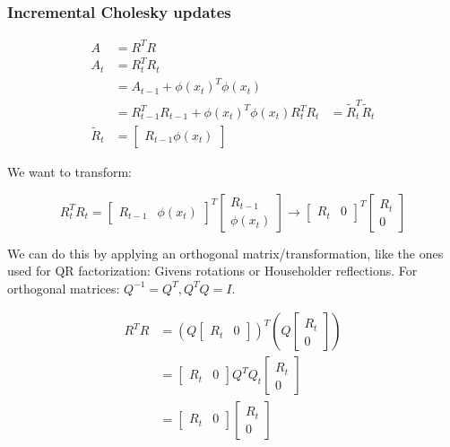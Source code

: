 \documentclass[a4paper]{article}
\begin{document}
\subsubsection*{Incremental Cholesky updates}

\begin{align*}
A &=R^T R \\
A_t &= R_t^T R_t \\
&= A_{t-1} + \phi(x_t)^T \phi(x_t) \\
&= R_{t-1}^T R_{t-1} + \phi(x_t)^T \phi(x_t)
R_t^T R_t &= \tilde{R}_t^T \tilde{R}_t \\
\tilde{R}_t &= \begin{bmatrix}R_{t-1} \phi(x_t) \end{bmatrix}
\end{align*}

We want to transform: 

$$R_t^T R_t = \begin{bmatrix} R_{t-1} & \phi(x_t) \end{bmatrix}^T \begin{bmatrix} R_{t-1} \\ \phi(x_t) \end{bmatrix} \rightarrow \begin{bmatrix} R_{t} & 0 \end{bmatrix}^T \begin{bmatrix} R_{t} \\ 0 \end{bmatrix}$$

We can do this by applying an orthogonal matrix/transformation, like the ones used for QR factorization: Givens rotations or Householder reflections. For orthogonal matrices: $Q^{-1}=Q^T, Q^T Q = I$.

\begin{align*}
R^T R &= (Q \begin{bmatrix} R_{t} & 0 \end{bmatrix})^T (Q \begin{bmatrix} R_{t} \\ 0 \end{bmatrix}) \\
&= \begin{bmatrix} R_{t} & 0 \end{bmatrix} Q^T Q_t \begin{bmatrix} R_{t} \\ 0 \end{bmatrix} \\
&= \begin{bmatrix} R_{t} & 0 \end{bmatrix} \begin{bmatrix} R_{t} \\ 0 \end{bmatrix}
\end{align*}
\end{document}

